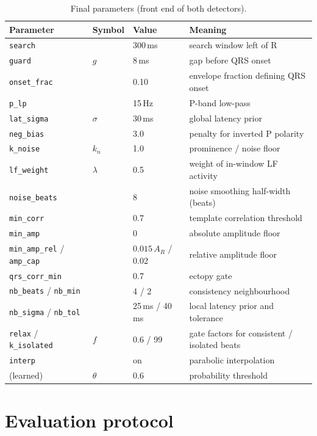 \documentclass[11pt,a4paper]{article}
\newcommand{\code}[1]{\texttt{#1}}
\begin{document}
\begin{table}[htbp]
\centering\small
\caption{Final parameters (front end of both detectors).}
\label{tab:params}
\begin{tabularx}{\textwidth}{lllL}
\toprule
Parameter & Symbol & Value & Meaning \\
\midrule
\code{search} & & 300\,ms & search window left of R \\
\code{guard} & $g$ & 8\,ms & gap before QRS onset \\
\code{onset\_frac} & & 0.10 & envelope fraction defining QRS onset \\
\code{p\_lp} & & 15\,Hz & P-band low-pass \\
\code{lat\_sigma} & $\sigma$ & 30\,ms & global latency prior \\
\code{neg\_bias} & & 3.0 & penalty for inverted P polarity \\
\code{k\_noise} & $k_n$ & 1.0 & prominence / noise floor \\
\code{lf\_weight} & $\lambda$ & 0.5 & weight of in-window LF activity \\
\code{noise\_beats} & & 8 & noise smoothing half-width (beats) \\
\code{min\_corr} & & 0.7 & template correlation threshold \\
\code{min\_amp} & & 0 & absolute amplitude floor \\
\code{min\_amp\_rel} / \code{amp\_cap} & & $0.015\,A_R$ / 0.02 & relative amplitude floor \\
\code{qrs\_corr\_min} & & 0.7 & ectopy gate \\
\code{nb\_beats} / \code{nb\_min} & & 4 / 2 & consistency neighbourhood \\
\code{nb\_sigma} / \code{nb\_tol} & & 25\,ms / 40\,ms & local latency prior and tolerance \\
\code{relax} / \code{k\_isolated} & $f$ & 0.6 / 99 & gate factors for consistent / isolated beats \\
\code{interp} & & on & parabolic interpolation \\
(learned) & $\theta$ & 0.6 & probability threshold \\
\bottomrule
\end{tabularx}
\end{table}

\section{Evaluation protocol}
\end{document}
